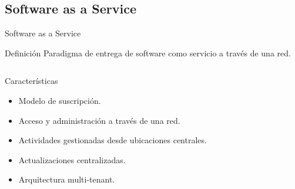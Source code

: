 \documentclass[10pt,xcolor=table ]{beamer}
\begin{document}
\subsection{Software as a Service}
\begin{frame}{Software as a Service}
	\begin{alertblock}{Definición}
		Paradigma de entrega de software como servicio a través de una red.
	\end{alertblock}

	\begin{columns}[c,onlytextwidth]
		\begin{block}{Características}
			\begin{itemize}
	        	\item Modelo de suscripción.
	        	\item Acceso y administración a través de una red.
	        	\item Actividades gestionadas desde ubicaciones centrales.
	        	\item Actualizaciones centralizadas.
	      		\item Arquitectura multi-tenant.
	    	\end{itemize}
		\end{block}
		\begin{figure}[H]

\end{figure}
\end{columns}
\end{frame}
\end{document}

